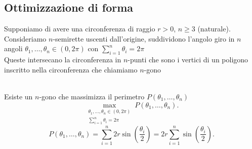 \documentclass[12px]{article}
\begin{document}
 \subsection{Ottimizzazione di forma}
 Supponiamo di avere una circonferenza di raggio $r>0$,  $n\geq 3$ (naturale).\\
 Consideriamo $n$-semirette uscenti dall'origine, suddividono l'angolo giro in $n$ angoli $\theta_1,\ldots,\theta_n\in(0,2\pi)$ con $ \sum^{n}_{i=1}\theta_i = 2\pi$\\
 Queste intersecano la circonferenza in $n$-punti che sono i vertici di un poligono inscritto nella circonferenza che chiamiamo $n$-gono\\
 \begin{center}
\end{center}
\\
Esiste un $n$-gono che massimizza il perimetro $P(\theta_1,\ldots,\theta_n)$
\[
	\max_{\substack{\theta_1,\ldots,\theta_n\in(0,2\pi)\\ \sum^{n}_{i=1}\theta_i = 2\pi}} P (\theta_1,\ldots,\theta_n)
.\] 
\[
	P(\theta_1,\ldots,\theta_n) = \sum^{n}_{i=1}2 r \sin \left(\frac{\theta_i}2 \right)  = 2r \sum^{n}_{i=1}\sin \left(\frac{\theta_i} 2 \right)
.\] 
\end{document}
